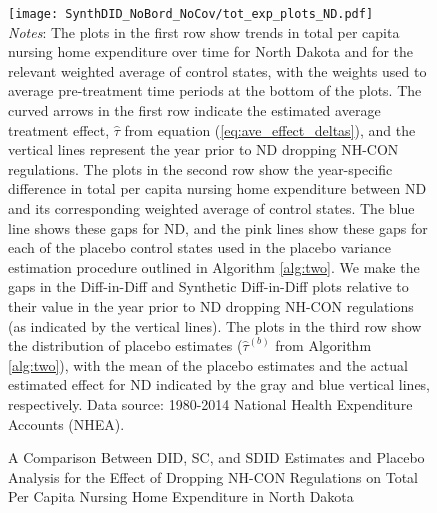 \documentclass[../Main.tex]{subfiles}
\begin{document}
\newpage
{}
\begin{figure}[t] 
    \setlength{}
	\caption{\label{fig:tot_exp_plots_nd} \centering A Comparison Between DID, SC, and SDID Estimates and Placebo Analysis for the Effect of Dropping NH-CON Regulations on Total Per Capita Nursing Home Expenditure in North Dakota} {\centering\texttt{[image: SynthDID\_NoBord\_NoCov/tot\_exp\_plots\_ND.pdf]}}
    \vspace{-1.4cm}\\
    \scriptsize
		\textit{Notes}: The plots in the first row show trends in total per capita nursing home expenditure over time for North Dakota and for the relevant weighted average of control states, with the weights used to average pre-treatment time periods at the bottom of the plots. The curved arrows in the first row indicate the estimated average treatment effect, $\hat{\tau}$ from equation (\ref{eq:ave_effect_deltas}), and the vertical lines represent the year prior to ND dropping NH-CON regulations. The plots in the second row show the year-specific difference in total per capita nursing home expenditure between ND and its corresponding weighted average of control states. The blue line shows these gaps for ND, and the pink lines show these gaps for each of the placebo control states used in the placebo variance estimation procedure outlined in Algorithm \ref{alg:two}. We make the gaps in the Diff-in-Diff and Synthetic Diff-in-Diff plots relative to their value in the year prior to ND dropping NH-CON regulations (as indicated by the vertical lines). The plots in the third row show the distribution of placebo estimates ($\hat{\tau}^{(b)}$ from Algorithm \ref{alg:two}), with the mean of the placebo estimates and the actual estimated effect for ND indicated by the gray and blue vertical lines, respectively. Data source: 1980-2014 National Health Expenditure Accounts (NHEA).
\end{figure}
\restoregeometry
\clearpage
\end{document}
